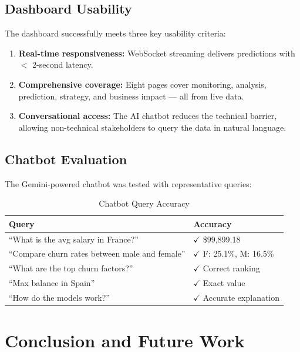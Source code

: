 \documentclass[12pt, a4paper]{report}
\begin{document}
\section{Dashboard Usability}

The dashboard successfully meets three key usability criteria:

\begin{enumerate}
    \item \textbf{Real-time responsiveness:} WebSocket streaming delivers predictions with $<$ 2-second latency.
    \item \textbf{Comprehensive coverage:} Eight pages cover monitoring, analysis, prediction, strategy, and business impact --- all from live data.
    \item \textbf{Conversational access:} The AI chatbot reduces the technical barrier, allowing non-technical stakeholders to query the data in natural language.
\end{enumerate}

\section{Chatbot Evaluation}

The Gemini-powered chatbot was tested with representative queries:

\begin{table}[H]
\centering
\caption{Chatbot Query Accuracy}
\label{tab:chatbot}
\begin{tabularx}{\textwidth}{X l}
\toprule
\textbf{Query} & \textbf{Accuracy} \\
\midrule
``What is the avg salary in France?'' & $\checkmark$ \$99,899.18 \\
``Compare churn rates between male and female'' & $\checkmark$ F: 25.1\%, M: 16.5\% \\
``What are the top churn factors?'' & $\checkmark$ Correct ranking \\
``Max balance in Spain'' & $\checkmark$ Exact value \\
``How do the models work?'' & $\checkmark$ Accurate explanation \\
\bottomrule
\end{tabularx}
\end{table}


\chapter{Conclusion and Future Work}
\end{document}
